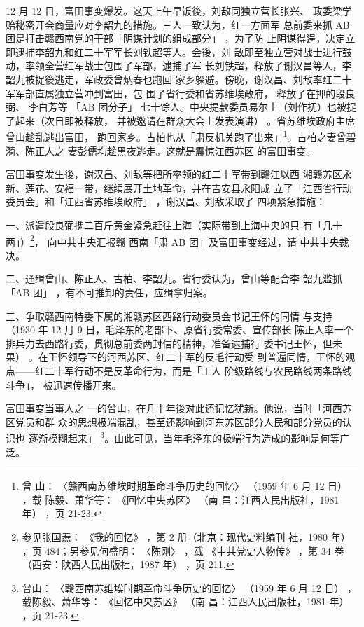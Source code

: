 12 月 12 日，富田事变爆发。这天上午早饭後，刘敌同独立营长张兴、 政委梁学
贻秘密开会商量应对李韶九的措施。三人一致认为，红一方面军 总前委来抓 AB
团是打击赣西南党的干部「阴谋计划的组成部分」 ，为了防 止阴谋得逞，决定立
即逮捕李韶九和红二十军军长刘铁超等人。会後，刘 敌即至独立营对战士进行鼓
动，率领全营红军战士包围了军部，逮捕了军 长刘铁超，释放了谢汉昌等人，李
韶九被捉後逃走，军政委曾炳春也跑回 家乡躲避。傍晚，谢汉昌、刘敌率红二十
军军部直属独立营冲到富田，包 围了省行委和省苏维埃政府， 释放了在押的段良
弼、 李白芳等 「AB 团分子」 七十馀人。中央提款委员易尔士（刘作抚）也被捉
了起来（次日即被释放， 并被邀请在群众大会上发表演讲） 。省苏维埃政府主席
曾山趁乱逃出富田， 跑回家乡。古柏也从「肃反机关跑了出来」\footnote{曾
山： 〈赣西南苏维埃时期革命斗争历史的回忆〉 （1959 年 6 月 12 日） ，载
陈毅、萧华等： 《回忆中央苏区》 （南 昌：江西人民出版社，1981 年） ，页
21-23.}。古柏之妻曾碧漪、陈正人之 妻彭儒均趁黑夜逃走。这就是震惊江西苏区
的富田事变。

富田事变发生後，谢汉昌、刘敌等把所率领的红二十军带到赣江以西
湘赣苏区永新、莲花、安福一带，继续展开土地革命，并在吉安县永阳成
立了「江西省行动委员会」和「江西省苏维埃政府」
，谢汉昌、刘敌采取了
四项紧急措施：

一、派遣段良弼携二百斤黄金紧急赶往上海（实际带到上海中央的只 有「几十
两」）\footnote{ 参见张国焘： 《我的回忆》 ，第 2 册（北京：现代史料编刊
社，1980 年） ，页 484；另参见何盛明： 〈陈刚〉 ，载 《中共党史人物传》
，第 34 卷（西安：陕西人民出版社，1987 年） ，页 211.}， 向中共中央汇报赣
西南「肃 AB 团」及富田事变经过，请  中共中央裁决。

二、通缉曾山、陈正人、古柏、李韶九。省行委认为，曾山等配合李 韶九滥抓
「AB 团」 ，有不可推卸的责任，应缉拿归案。
 
三、争取赣西南特委下属的湘赣苏区西路行动委员会书记王怀的同情
与支持（1930 年 12 月 9 日，毛泽东的老部下、原省行委常委、宣传部长
陈正人率一个排兵力去西路行委，贯彻总前委两封信的精神，准备逮捕行
委书记王怀，但未果）
。在王怀领导下的河西苏区、红二十军的反毛行动受
到普遍同情，王怀的观点——红二十军行动不是反革命行为，而是「工人
阶级路线与农民路线两条路线斗争」， 被迅速传播开来。

富田事变当事人之
一的曾山，在几十年後对此还记忆犹新。他说，当时「河西苏区党员和群
众的思想极端混乱，甚至还影响到河东苏区部分人民和部分党员的认识也
逐渐模糊起来」 \footnote{ 曾山：
〈赣西南苏维埃时期革命斗争历史的回忆〉
（1959 年 6 月 12 日）
，载陈毅、萧华等：
《回忆中央苏区》
（南
昌：江西人民出版社，1981 年）
，页 21-23.}。由此可见，当年毛泽东的极端行为造成的影响是何等广
泛。

